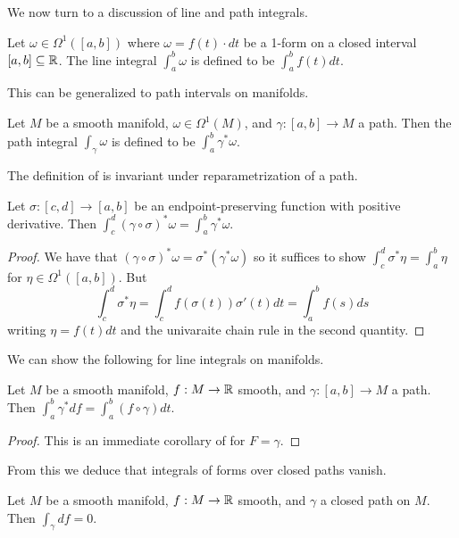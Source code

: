 We now turn to a discussion of line and path integrals. 
\begin{definition}\label{def: line integral}
    Let $\omega\in\Omega^{1}([a,b])$ where $\omega=f(t)\cdot dt$ be a 1-form on a closed interval $[a,b]\subseteq\mathbb{R}$. The line integral $\int_{a}^{b}\omega$ is defined to be $\int_{a}^{b}f(t)dt$. 
\end{definition}
This can be generalized to path intervals on manifolds. 
\begin{definition}\label{def: path integral}
    Let $M$ be a smooth manifold, $\omega\in \Omega^{1}(M)$, and $\gamma:[a,b]\to M$ a path. Then the path integral $\int_{\gamma}\omega$ is defined to be $\int_{a}^{b}\gamma^{*}\omega$. 
\end{definition}
The definition of  is invariant under reparametrization of a path. 
\begin{lemma}\label{lem: invariance under reparametrization}
    Let $\sigma:[c,d]\to[a,b]$ be an endpoint-preserving function with positive derivative. Then $\int_{c}^{d}(\gamma\circ\sigma)^{*}\omega=\int_{a}^{b}\gamma^{*}\omega$. 
\end{lemma}
\begin{proof}
    We have that $(\gamma\circ\sigma)^{*}\omega=\sigma^{*}(\gamma^{*}\omega)$ so it suffices to show $\int_{c}^{d}\sigma^{*}\eta=\int_{a}^{b}\eta$ for $\eta\in\Omega^{1}([a,b])$. But 
    $$\int_{c}^{d}\sigma^{*}\eta=\int_{c}^{d}f(\sigma(t))\sigma'(t)dt=\int_{a}^{b}f(s)ds$$
    writing $\eta=f(t)dt$ and the univaraite chain rule in the second quantity. 
\end{proof}
We can show the following for line integrals on manifolds. 
\begin{lemma}\label{lem: line integrals on manifolds computation}
    Let $M$ be a smooth manifold, $f:M\to\mathbb{R}$ smooth, and $\gamma:[a,b]\to M$ a path. Then $\int_{a}^{b}\gamma^{*}df=\int_{a}^{b}(f\circ\gamma)dt$. 
\end{lemma}
\begin{proof}
    This is an immediate corollary of  for $F=\gamma$. 
\end{proof}
From this we deduce that integrals of forms over closed paths vanish. 
\begin{corollary}\label{corr: differential of function have trivial closed path integral}
    Let $M$ be a smooth manifold, $f:M\to\mathbb{R}$ smooth, and $\gamma$ a closed path on $M$. Then $\int_{\gamma}df=0$. 
\end{corollary}
